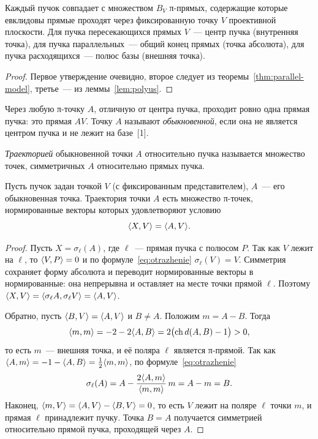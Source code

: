 \begin{proposition}\label{prop:puchok}
Каждый пучок совпадает с множеством $B_V$ π-прямых, содержащие которые евклидовы прямые проходят через фиксированную точку $V$ проективной плоскости. Для пучка пересекающихся прямых $V$~--- центр пучка (внутренняя точка), для пучка параллельных~--- общий конец прямых (точка абсолюта), для пучка расходящихся~--- полюс базы (внешняя точка).
\end{proposition}
\begin{proof}
Первое утверждение очевидно, второе следует из теоремы~\ref{thm:parallel-model}, третье~--- из леммы~\ref{lem:polyus}.
\end{proof}

Через любую π-точку $A$, отличную от центра пучка, проходит ровно одна прямая пучка: это прямая $AV$. Точку $A$ называют \emph{обыкновенной}, если она не является центром пучка и не лежит на базе~[1].

\begin{definition}[\!\!{[1]}]
\emph{Траекторией} обыкновенной точки $A$ относительно пучка называется множество точек, симметричных $A$ относительно прямых пучка.
\end{definition}

\begin{theorem}\label{thm:traektoriya}
Пусть пучок задан точкой $V$ (с фиксированным представителем), $A$~--- его обыкновенная точка. Траектория точки $A$ есть множество π-точек, нормированные векторы которых удовлетворяют условию
\[
\langle X,V\rangle=\langle A,V\rangle.
\]
\end{theorem}
\begin{proof}
Пусть $X=\sigma_\ell(A)$, где $\ell$~--- прямая пучка с полюсом $P$. Так как $V$ лежит на $\ell$, то $\langle V,P\rangle=0$ и по формуле~\eqref{eq:otrazhenie} $\sigma_\ell(V)=V$. Симметрия сохраняет форму абсолюта и переводит нормированные векторы в нормированные: она непрерывна и оставляет на месте точки прямой $\ell$. Поэтому $\langle X,V\rangle=\langle \sigma_\ell A,\sigma_\ell V\rangle=\langle A,V\rangle$.

Обратно, пусть $\langle B,V\rangle=\langle A,V\rangle$ и $B\ne A$. Положим $m=A-B$. Тогда
\[
\langle m,m\rangle=-2-2\langle A,B\rangle=2\bigl(\operatorname{ch} d(A,B)-1\bigr)>0,
\]
то есть $m$~--- внешняя точка, и её поляра $\ell$ является π-прямой. Так как $\langle A,m\rangle=-1-\langle A,B\rangle=\tfrac12\langle m,m\rangle$, по формуле~\eqref{eq:otrazhenie}
\[
\sigma_\ell(A)=A-\frac{2\langle A,m\rangle}{\langle m,m\rangle}\,m=A-m=B.
\]
Наконец, $\langle m,V\rangle=\langle A,V\rangle-\langle B,V\rangle=0$, то есть $V$ лежит на поляре $\ell$ точки $m$, и прямая $\ell$ принадлежит пучку. Точка $B=A$ получается симметрией относительно прямой пучка, проходящей через $A$.
\end{proof}

